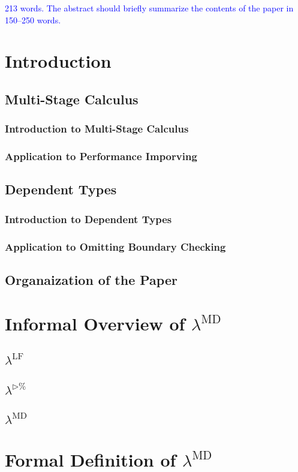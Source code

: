 \documentclass[runningheads]{llncs}
\newcommand{\blue}[1]{\textcolor{blue}{#1 }}
\newcommand{\LTP}{$\lambda^{\triangleright\%}$}
\newcommand{\LMD}{$\lambda^{\textrm{MD}}$}
\newcommand{\LLF}{$\lambda^{\textrm{LF}}$}
\begin{document}
\blue{213 words. The abstract should briefly summarize the contents of the paper in 150--250 words.}
%
%
%
\section{Introduction}
\subsection{Multi-Stage Calculus}
\subsubsection{Introduction to Multi-Stage Calculus}
\subsubsection{Application to Performance Imporving}
\subsection{Dependent Types}
\subsubsection{Introduction to Dependent Types}
\subsubsection{Application to Omitting Boundary Checking}
\subsection{Organaization of the Paper}

\section{Informal Overview of \LMD}
\subsection{\LLF}
\subsection{\LTP}
\subsection{\LMD}

\section{Formal Definition of \LMD}
\end{document}
